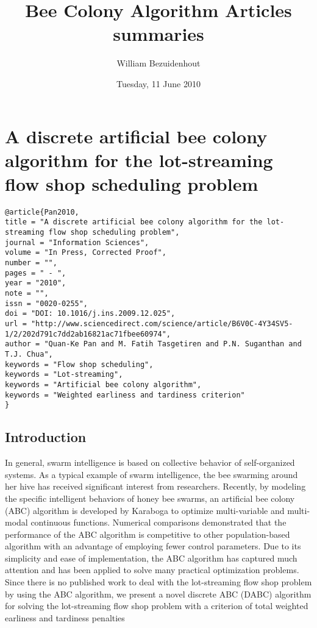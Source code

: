 \documentclass[pdftex,11pt]{article}
\title{Bee Colony Algorithm Articles summaries}
\author{William Bezuidenhout}
\date{Tuesday, 11 June 2010}
\begin{document}
\maketitle
\section{A discrete artificial bee colony algorithm for the lot-streaming flow shop scheduling problem}
\begin{verbatim}
@article{Pan2010,
title = "A discrete artificial bee colony algorithm for the lot-streaming flow shop scheduling problem",
journal = "Information Sciences",
volume = "In Press, Corrected Proof",
number = "",
pages = " - ",
year = "2010",
note = "",
issn = "0020-0255",
doi = "DOI: 10.1016/j.ins.2009.12.025",
url = "http://www.sciencedirect.com/science/article/B6V0C-4Y34SV5-1/2/202d791c7dd2ab16821ac71fbee60974",
author = "Quan-Ke Pan and M. Fatih Tasgetiren and P.N. Suganthan and T.J. Chua",
keywords = "Flow shop scheduling",
keywords = "Lot-streaming",
keywords = "Artificial bee colony algorithm",
keywords = "Weighted earliness and tardiness criterion"
}
\end{verbatim}
\subsection{Introduction}
In general, swarm intelligence is based on collective behavior of self-organized systems. As a typical example of swarm intelligence, the bee swarming around her hive has received significant interest from researchers. Recently, by modeling the specific intelligent behaviors of honey bee swarms, an artificial bee colony (ABC) algorithm is developed by Karaboga to optimize multi-variable and multi-modal continuous functions. Numerical comparisons demonstrated that the performance of the ABC algorithm is competitive to other population-based algorithm with an advantage of employing fewer control parameters. Due to its simplicity and ease of implementation, the ABC algorithm has captured much attention and has been applied to solve many practical optimization problems. Since there is no published work to deal with the lot-streaming flow shop problem by using the ABC algorithm, we present a novel discrete ABC (DABC) algorithm for solving the lot-streaming flow shop problem with a criterion of total weighted earliness and tardiness penalties
\end{document}
